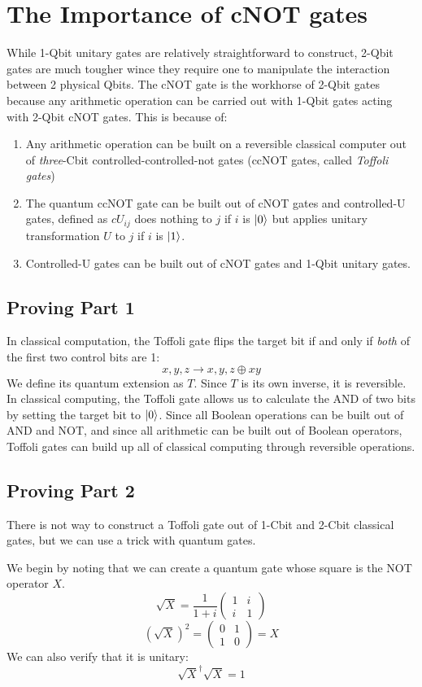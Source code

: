 \documentclass[letterpaper]{article}
\begin{document}
\section{The Importance of cNOT gates}
While 1-Qbit unitary gates are relatively straightforward to construct, 2-Qbit gates are much tougher wince they require one to manipulate the interaction between 2 physical Qbits. The cNOT gate is the workhorse of 2-Qbit gates because any arithmetic operation can be carried out with 1-Qbit gates acting with 2-Qbit cNOT gates. This is because of: 
\begin{enumerate}
	\item Any arithmetic operation can be built on a reversible classical computer out of \textsl{three}-Cbit controlled-controlled-not gates (ccNOT gates, called \textsl{Toffoli gates}) 
	\item The quantum ccNOT gate can be built out of cNOT gates and controlled-U gates, defined as $cU_{ij}$ does nothing to $j$ if $i$ is $\ket{0}$ but applies unitary transformation $U$ to $j$ if $i$ is $\ket{1}$. 
	\item Controlled-U gates can be built out of cNOT gates and 1-Qbit unitary gates. 
\end{enumerate}


\subsection{Proving Part 1}
In classical computation, the Toffoli gate flips the target bit if and only if \textsl{both} of the first two control bits are 1:
$$x, y, z \rightarrow x, y, z \oplus xy$$
We define its quantum extension as $T$. Since $T$ is its own inverse, it is reversible. In classical computing, the Toffoli gate allows us to calculate the AND of two bits by setting the target bit to $\ket{0}$. Since all Boolean operations can be built out of AND and NOT, and since all arithmetic can be built out of Boolean operators, Toffoli gates can build up all of classical computing through reversible operations. 

\subsection{Proving Part 2}
There is not way to construct a Toffoli gate out of 1-Cbit and 2-Cbit classical gates, but we can use a trick with quantum gates. 

We begin by noting that we can create a quantum gate whose square is the NOT operator $X$. 
$$ \sqrt{X} = \frac{1}{1 + i} 
\begin{pmatrix}
1 & i \\
i & 1
\end{pmatrix}
$$
$$
(\sqrt{X})^{2} = 
\begin{pmatrix}
0 & 1 \\
1 & 0
\end{pmatrix}
= X
$$
We can also verify that it is unitary:
$$\sqrt{X}^{\dagger}\sqrt{X} = 1$$
\end{document}
